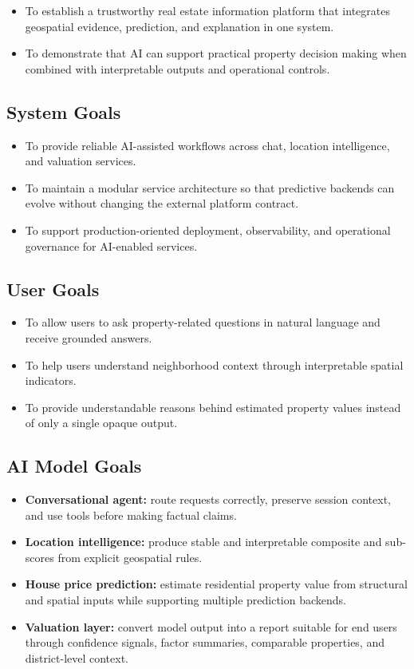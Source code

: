 \begin{itemize}
    \item To establish a trustworthy real estate information platform that integrates geospatial evidence, prediction, and explanation in one system.
    \item To demonstrate that AI can support practical property decision making when combined with interpretable outputs and operational controls.
\end{itemize}

\subsection{System Goals}

\begin{itemize}
    \item To provide reliable AI-assisted workflows across chat, location intelligence, and valuation services.
    \item To maintain a modular service architecture so that predictive backends can evolve without changing the external platform contract.
    \item To support production-oriented deployment, observability, and operational governance for AI-enabled services.
\end{itemize}

\subsection{User Goals}

\begin{itemize}
    \item To allow users to ask property-related questions in natural language and receive grounded answers.
    \item To help users understand neighborhood context through interpretable spatial indicators.
    \item To provide understandable reasons behind estimated property values instead of only a single opaque output.
\end{itemize}

\subsection{AI Model Goals}

\begin{itemize}
    \item \textbf{Conversational agent:} route requests correctly, preserve session context, and use tools before making factual claims.
    \item \textbf{Location intelligence:} produce stable and interpretable composite and sub-scores from explicit geospatial rules.
    \item \textbf{House price prediction:} estimate residential property value from structural and spatial inputs while supporting multiple prediction backends.
    \item \textbf{Valuation layer:} convert model output into a report suitable for end users through confidence signals, factor summaries, comparable properties, and district-level context.
\end{itemize}

